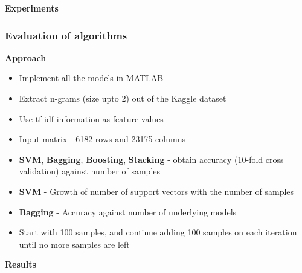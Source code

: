 \documentclass[9pt]{beamer}
\begin{document}
    \begin{frame}
        \begin{center}
            \textbf{Experiments}
        \end{center}
    \end{frame}
    
    \begin{frame}
        \frametitle{Evaluation of algorithms}
        \begin{center}
            \textbf{Approach}
        \end{center}
        \begin{itemize}
            \item{Implement all the models in MATLAB}
            \item{Extract n-grams (size upto 2) out of the Kaggle dataset}
            \item{Use tf-idf information as feature values}
            \item{Input matrix - 6182 rows and 23175 columns}
            \item{\textbf{SVM}, \textbf{Bagging}, \textbf{Boosting}, \textbf{Stacking} - obtain accuracy (10-fold cross validation) against number of samples}
            \item{\textbf{SVM} - Growth of number of support vectors with the number of samples}
            \item{\textbf{Bagging} - Accuracy against number of underlying models}
            \item{Start with 100 samples, and continue adding 100 samples on each iteration until no more samples are left}
        \end{itemize}
    \end{frame}
    
    \begin{frame}
        \begin{center}
            \textbf{Results}
        \end{center}
    \end{frame}
    
\end{document}
